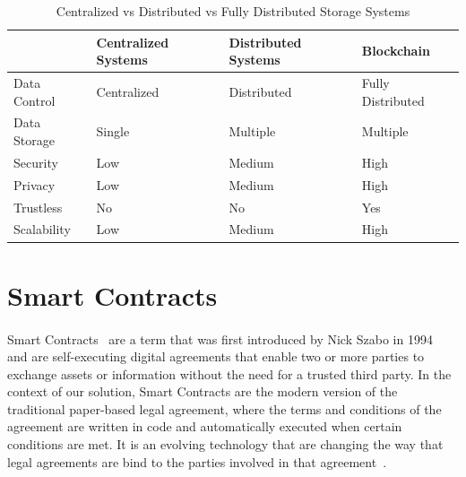 \begin{table}[h]\label{tab:centralized-vs-distributed-vs-blockchain}
    \centering
    \renewcommand{\arraystretch}{1.5} %
    \begin{tabular}{|l|l|l|l|}
        \hline
                     & \textbf{Centralized Systems} & \textbf{Distributed Systems} & \textbf{Blockchain} \\ \hline
        Data Control & Centralized                  & Distributed                  & Fully Distributed   \\ \hline
        Data Storage & Single                       & Multiple                     & Multiple            \\ \hline
        Security     & Low                          & Medium                       & High                \\ \hline
        Privacy      & Low                          & Medium                       & High                \\ \hline
        Trustless    & No                           & No                           & Yes                 \\ \hline
        Scalability  & Low                          & Medium                       & High                \\ \hline
    \end{tabular}
    \caption{Centralized vs Distributed vs Fully Distributed Storage Systems}
    \label{tab:comparison}
\end{table}

\section{Smart Contracts}\label{sec:smart-contracts}
\paragraph{}

Smart Contracts~\cite{vigliotti2021we} are a term that was first introduced by Nick Szabo in 1994~\cite{szabo2017winning} and are self-executing digital agreements that enable two or more parties to exchange
assets or information without the need for a trusted third party.
In the context of our solution, Smart Contracts are the modern version of the traditional paper-based legal agreement, where the terms and conditions of the agreement are written in code and automatically executed when certain conditions are met.
It is an evolving technology that are changing the way that legal agreements are bind to the parties involved in that agreement~\cite{Kaur2023}.

